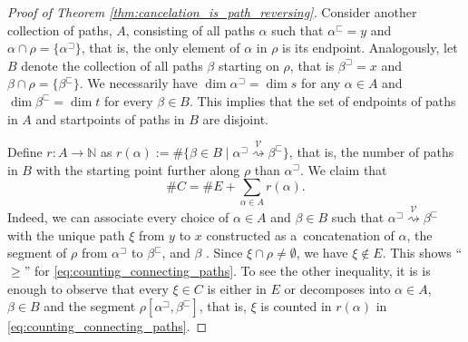 \documentclass[a4paper,12pt, USenglish,cleveref,autoref,thm-restate]{article}
\newcommand\todo[1]{\textcolor{red}{[\textbf{TODO:} #1]}}
\newcommand{\mf}{h}
\newcommand{\pbeg}[1]{#1^\sqsubset}
\newcommand{\pend}[1]{#1^\sqsupset}
\newcommand{\NN}{\mathbb{N}}
\newcommand{\cV}{\mathcal{V}}
\def\pathh#1{\overset{#1}{\rightsquigarrow}}
\def\pathh#1{\overset{#1}{\rightsquigarrow}}
\begin{document}
\begin{appendices}
\begin{proof}[Proof of Theorem \ref{thm:cancelation_is_path_reversing}]

    
    \noindent Consider another collection of paths, $A$, consisting of all paths $\alpha$ such that $\pbeg\alpha=y$ and $\alpha\cap\rho=\{\pend\alpha\}$, that is, the only element of $\alpha$ in $\rho$ is its endpoint.
    Analogously, let $B$ denote the collection of all paths $\beta$ starting on $\rho$, that is $\pend\beta=x$ and $\beta\cap\rho=\{\pbeg\beta\}$.
    We necessarily have $\dim\pend\alpha=\dim s$ for any $\alpha\in A$ and
        $\dim\pbeg\beta=\dim t$ for every $\beta\in B$.
    This implies that the set of endpoints of paths in $A$ and startpoints of paths in $B$ are disjoint.
    
    
    \noindent Define $r \colon A\rightarrow\NN$ as 
        $r(\alpha):=\#\{\beta\in B\mid \pend\alpha\pathh{\cV}\pbeg\beta\}$, that is, the number of paths in $B$ with the starting point further along $\rho$ than $\pend\alpha$.
    We claim that
    \begin{equation}\label{eq:counting_connecting_paths}
        \# C = \# E + \sum_{\alpha\in A} r(\alpha).
    \end{equation}
    Indeed, we can associate every choice of $\alpha\in A$ and $\beta\in B$ such that 
    $\pend\alpha\pathh{\cV}\pbeg\beta$ 
    with the unique path $\xi$ from $y$ to $x$
        constructed as a~concatenation of $\alpha$,
        the segment of $\rho$ from $\pend\alpha$ to $\pbeg\beta$,
        and $\beta$ 
        .
    \noindent Since $\xi \cap \rho \neq \emptyset$, we have $\xi\not\in E$.
    This shows ``$\geq$'' for \eqref{eq:counting_connecting_paths}. 
    To see the other inequality, it is is enough to observe that every $\xi\in C$ is either in $E$ or decomposes into
    $\alpha\in A$, $\beta\in B$ and the segment $\rho[\pend\alpha, \pbeg\beta]$, that is, $\xi$ is counted in $r(\alpha)$ in \eqref{eq:counting_connecting_paths}.
    

\end{proof}
\end{appendices}
\end{document}
